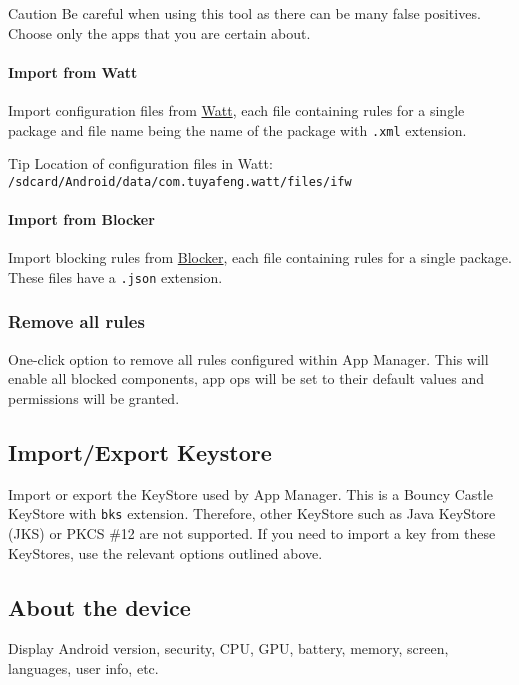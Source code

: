 \begin{danger}{Caution}
    Be careful when using this tool as there can be many false positives.
    Choose only the apps that you are certain about.
\end{danger}

\paragraph{Import from Watt} Import configuration files from \href{https://github.com/tuyafeng/Watt}{Watt}, each file
containing rules for a single package and file name being the name of the package with \texttt{.xml} extension.

\begin{tip}{Tip}
    Location of configuration files in Watt: \texttt{/sdcard/Android/data/com.tuyafeng.watt/files/ifw}
\end{tip}

\paragraph{Import from Blocker} Import blocking rules from \href{https://github.com/lihenggui/blocker}{Blocker}, each
file containing rules for a single package.
These files have a \texttt{.json} extension.

\subsubsection{Remove all rules}
One-click option to remove all rules configured within App Manager.
This will enable all blocked components, app ops will be set to their default values and permissions will be granted.


\subsection{Import/Export Keystore}\label{subsec:import/export-keystore}
Import or export the KeyStore used by App Manager.
This is a Bouncy Castle KeyStore with \texttt{bks} extension.
Therefore, other KeyStore such as Java KeyStore (JKS) or PKCS \#12 are not supported.
If you need to import a key from these KeyStores, use the relevant options outlined above.

\subsection{About the device}\label{subsec:device-info}
Display Android version, security, CPU, GPU, battery, memory, screen, languages, user info, etc.
